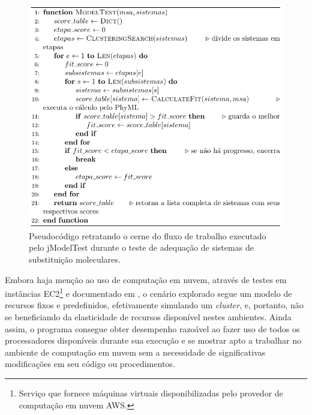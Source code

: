 \documentclass[english,brazilian]{UNISINOSmonografia} %
\newcommand\defaultFigureWidth{0.9}
\begin{document}
\begin{figure}[tb]
	\centering%
	\begin{minipage}{\defaultFigureWidth\textwidth}
		\caption{Pseudocódigo retratando o cerne do fluxo de trabalho executado pelo jModelTest durante o teste de adequação de sistemas de substituição moleculares.}
		\label{fig:modelo-jmodel-algo}
		\includegraphics[width=\textwidth]{modelo-jmodel-algo}
	\end{minipage}
\end{figure}

Embora haja menção ao uso de computação em nuvem, através de testes em instâncias 
EC2\footnote{
	Serviço que fornece máquinas virtuais disponibilizadas pelo provedor de computação em nuvem AWS.
} 
e documentado em , o cenário explorado segue um modelo de recursos fixos e predefinidos, efetivamente simulando um \textit{cluster}, e, portanto, não se beneficiando da elasticidade de recursos disponível nestes ambientes.
Ainda assim, o programa consegue obter desempenho razoável ao fazer uso de todos os processadores disponíveis durante sua execução e se mostrar apto a trabalhar no ambiente de computação em nuvem sem a necessidade de significativas modificações em seu código ou procedimentos.
\end{document}
